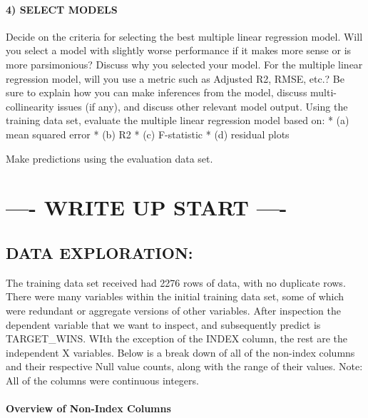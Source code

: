 \documentclass[
]{article}
\begin{document}
\paragraph{4) SELECT MODELS}\label{select-models}

Decide on the criteria for selecting the best multiple linear regression
model. Will you select a model with slightly worse performance if it
makes more sense or is more parsimonious? Discuss why you selected your
model. For the multiple linear regression model, will you use a metric
such as Adjusted R2, RMSE, etc.? Be sure to explain how you can make
inferences from the model, discuss multi-collinearity issues (if any),
and discuss other relevant model output. Using the training data set,
evaluate the multiple linear regression model based on: * (a) mean
squared error * (b) R2 * (c) F-statistic * (d) residual plots

Make predictions using the evaluation data set.

\section{---- WRITE UP START ----}\label{write-up-start--}

\subsection{DATA EXPLORATION:}\label{data-exploration-1}

The training data set received had 2276 rows of data, with no duplicate
rows. There were many variables within the initial training data set,
some of which were redundant or aggregate versions of other variables.
After inspection the dependent variable that we want to inspect, and
subsequently predict is TARGET\_WINS. WIth the exception of the INDEX
column, the rest are the independent X variables. Below is a break down
of all of the non-index columns and their respective Null value counts,
along with the range of their values. Note: All of the columns were
continuous integers.

\paragraph{Overview of Non-Index
Columns}\label{overview-of-non-index-columns}
\end{document}

